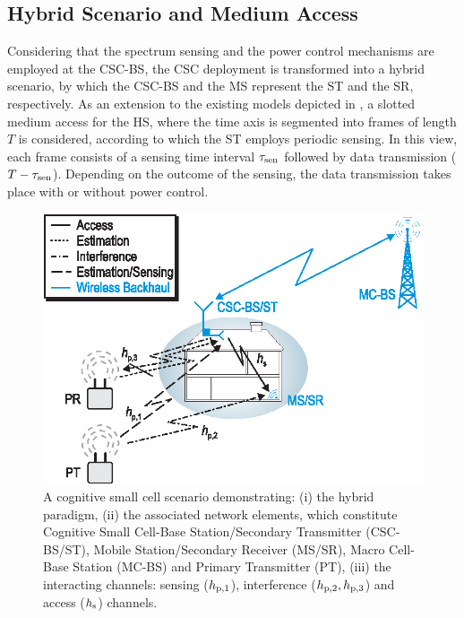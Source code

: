 \subsection{Hybrid Scenario and Medium Access}
Considering that the spectrum sensing and the power control mechanisms are employed at the CSC-BS, the CSC deployment is transformed into a hybrid scenario, by which the CSC-BS and the MS represent the ST and the SR, respectively. As an extension to the existing models depicted in \cite{Kang09, Sharma14}, a slotted medium access for the HS, where the time axis is segmented into frames of length $T$ is considered, according to which the ST employs periodic sensing. In this view, each frame consists of a sensing time interval $\tau_{\text{sen}}$ followed by data transmission ($T - \tau_{\text{sen}}$). Depending on the outcome of the sensing, the data transmission takes place with or without power control. 
\begin{figure}[!t]
\centering
\includegraphics[width = \figscalet]{figures/CR_Scenario_Hybrid}
\caption{A cognitive small cell scenario demonstrating: (i) the hybrid paradigm, (ii) the associated network elements, which constitute Cognitive Small Cell-Base Station/Secondary Transmitter (CSC-BS/ST), Mobile Station/Secondary Receiver (MS/SR), Macro Cell-Base Station (MC-BS) and Primary Transmitter (PT), (iii) the interacting channels: sensing ($h_{\text{p,1}}$), interference ($h_{\text{p,2}}, h_{\text{p,3}}$) and access ($h_{\text{s}}$) channels.}
\label{fig_HS:scenario}
\end{figure}

